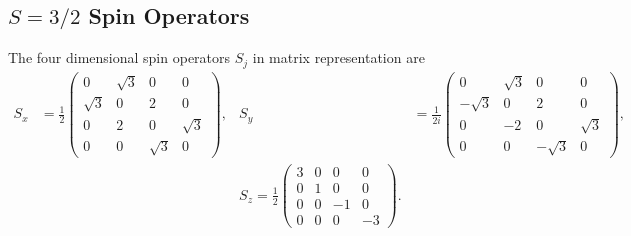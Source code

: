 \subsection{$S=3/2$ Spin Operators}
The four dimensional  spin operators $S_j$ in matrix representation are
\begin{equation}
    \begin{align}
        S_x &= \frac{1}{2} \begin{pmatrix}
            0 & \sqrt{3} & 0 & 0 \\
            \sqrt{3} & 0 & 2 & 0  \\
            0 & 2 & 0 & \sqrt{3} \\ 
            0 & 0 & \sqrt{3} & 0
        \end{pmatrix},&
            S_y &= \frac{1}{{2i}} \begin{pmatrix}
                0 & \sqrt{3} & 0 & 0   \\
                -\sqrt{3} & 0  & 2 & 0 \\
                0 & -2 & 0 & \sqrt{3}\\ 
                0 & 0 & -\sqrt{3} & 0
		\end{pmatrix}, \\
                &
        &S_z = \frac{1}{2} \begin{pmatrix}
            3 & 0 & 0 & 0   \\
            0 & 1 & 0 & 0  \\
            0 & 0 & -1 & 0  \\
            0 & 0 & 0 & -3
		\end{pmatrix}.
        &
    \end{align}
	\label{eq:s1.5_spin_operators}
\end{equation}
